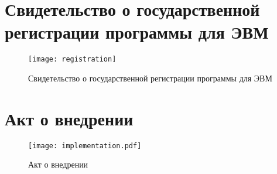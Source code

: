 \chapter{Свидетельство о государственной регистрации программы для ЭВМ}\label{ch:app1}
\begin{center}
    \begin{figure}[hb]
        \texttt{[image: registration]}
        \caption{Свидетельство о государственной регистрации программы для ЭВМ}\label{app:fig:registration}
    \end{figure}
\end{center}



\chapter{Акт о внедрении}\label{ch:app2}
\begin{center}
    \begin{figure}[hb]
        \texttt{[image: implementation.pdf]}
        \caption{Акт о внедрении}\label{app:fig:implementation}
    \end{figure}
\end{center}
